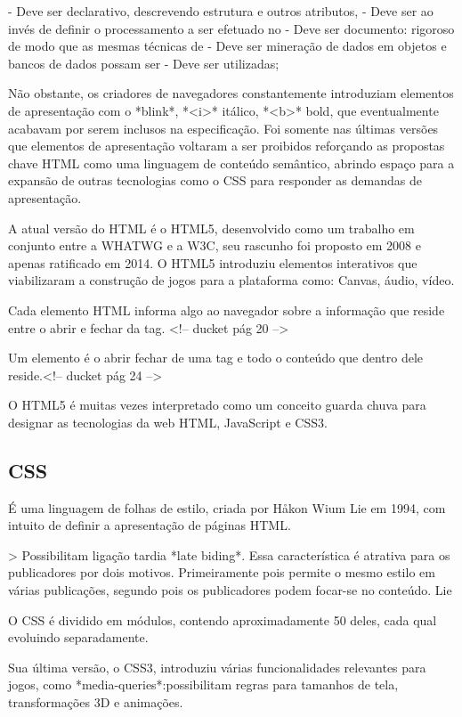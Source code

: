 \documentclass[11pt,a4paper]{article}
\begin{document}
- Deve ser declarativo, descrevendo estrutura e outros atributos,
- Deve ser ao invés de definir o processamento a ser efetuado no
- Deve ser documento: rigoroso de modo que as mesmas técnicas de
- Deve ser mineração de dados em objetos e bancos de dados possam ser
- Deve ser utilizadas;

Não obstante, os criadores de navegadores constantemente introduziam
elementos de apresentação com o *blink*, *<i>* itálico, *<b>* bold,
que eventualmente acabavam por serem inclusos na especificação. Foi
somente nas últimas versões que elementos de apresentação voltaram
a ser proibidos reforçando as propostas chave HTML como uma linguagem
de conteúdo semântico, abrindo espaço para a expansão de outras
tecnologias como o CSS para responder as demandas de apresentação.

A atual versão do HTML é o HTML5, desenvolvido como um trabalho em
conjunto entre a WHATWG e a W3C, seu rascunho foi proposto em 2008 e
apenas ratificado em 2014. O HTML5 introduziu elementos interativos que
viabilizaram a construção de jogos para a plataforma como: Canvas,
áudio, vídeo.

Cada elemento HTML informa algo ao navegador sobre a informação que
reside entre o abrir e fechar da tag. <!-- ducket pág 20 -->

Um elemento é o abrir fechar de uma tag e todo o conteúdo que dentro
dele reside.<!-- ducket pág 24 -->

O HTML5 é muitas vezes interpretado como um conceito guarda chuva para
designar as tecnologias da web HTML, JavaScript e CSS3.


\subsection{CSS}

É uma linguagem de folhas de estilo, criada por Håkon Wium Lie em
1994, com intuito de definir a apresentação de páginas HTML.

>  Possibilitam ligação tardia *late biding*. Essa característica
é atrativa para os publicadores por dois motivos. Primeiramente pois
permite o mesmo estilo em várias publicações, segundo pois os
publicadores podem focar-se no conteúdo. Lie

O CSS é dividido em módulos, contendo aproximadamente 50 deles, cada
qual evoluindo separadamente.

Sua última versão, o CSS3, introduziu várias funcionalidades
relevantes para jogos, como *media-queries*:possibilitam regras para
tamanhos de tela, transformações 3D e animações.
\end{document}
